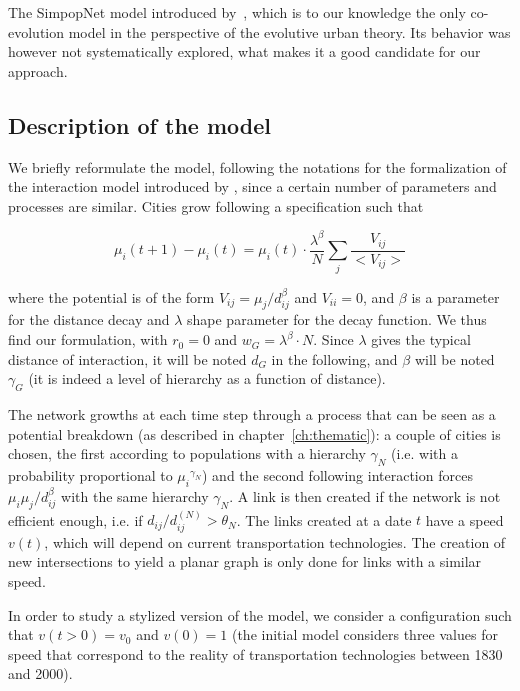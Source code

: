 The SimpopNet model introduced by~\cite{schmitt2014modelisation}, which is to our knowledge the only co-evolution model in the perspective of the evolutive urban theory. Its behavior was however not systematically explored, what makes it a good candidate for our approach.



\subsection{Description of the model}


We briefly reformulate the model, following the notations for the formalization of the interaction model introduced by \cite{raimbault2018indirect}, since a certain number of parameters and processes are similar. Cities grow following a specification such that

\[
\mu_i(t+1) - \mu_i (t) = \mu_i (t) \cdot \frac{\lambda^{\beta}}{N} \sum_{j} \frac{V_{ij}}{<V_{ij}>}
\]

where the potential is of the form $V_{ij} = \mu_j / d_{ij}^\beta$ and $V_{ii}=0$, and $\beta$ is a parameter for the distance decay and $\lambda$ shape parameter for the decay function. We thus find our formulation, with $r_0 = 0$ and $w_G = \lambda^\beta \cdot N$. Since $\lambda$ gives the typical distance of interaction, it will be noted $d_G$ in the following, and $\beta$ will be noted $\gamma_G$ (it is indeed a level of hierarchy as a function of distance).

The network growths at each time step through a process that can be seen as a potential breakdown (as described in chapter~\ref{ch:thematic}): a couple of cities is chosen, the first according to populations with a hierarchy $\gamma_N$ (i.e. with a probability proportional to ${\mu_i}^{\gamma_N}$) and the second following interaction forces $\mu_i \mu_j / d_{ij}^\beta$ with the same hierarchy $\gamma_N$. A link is then created if the network is not efficient enough, i.e. if $d_{ij}/d^{(N)}_{ij}> \theta_N$. The links created at a date $t$ have a speed $v(t)$, which will depend on current transportation technologies. The creation of new intersections to yield a planar graph is only done for links with a similar speed.

In order to study a stylized version of the model, we consider a configuration such that $v(t > 0) = v_0$ and $v(0) = 1$ (the initial model considers three values for speed that correspond to the reality of transportation technologies between 1830 and 2000).


